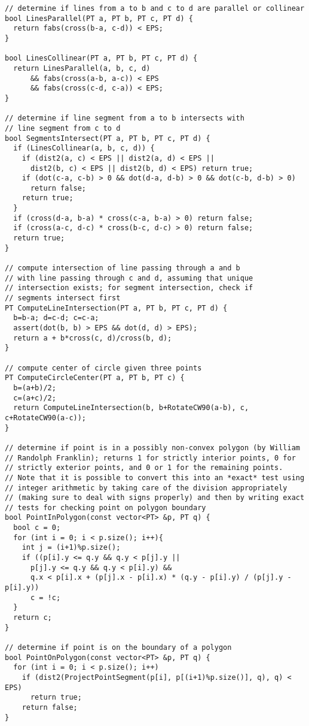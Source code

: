 \begin{lstlisting}
// determine if lines from a to b and c to d are parallel or collinear
bool LinesParallel(PT a, PT b, PT c, PT d) { 
  return fabs(cross(b-a, c-d)) < EPS; 
}

bool LinesCollinear(PT a, PT b, PT c, PT d) { 
  return LinesParallel(a, b, c, d)
      && fabs(cross(a-b, a-c)) < EPS
      && fabs(cross(c-d, c-a)) < EPS; 
}

// determine if line segment from a to b intersects with 
// line segment from c to d
bool SegmentsIntersect(PT a, PT b, PT c, PT d) {
  if (LinesCollinear(a, b, c, d)) {
    if (dist2(a, c) < EPS || dist2(a, d) < EPS ||
      dist2(b, c) < EPS || dist2(b, d) < EPS) return true;
    if (dot(c-a, c-b) > 0 && dot(d-a, d-b) > 0 && dot(c-b, d-b) > 0)
      return false;
    return true;
  }
  if (cross(d-a, b-a) * cross(c-a, b-a) > 0) return false;
  if (cross(a-c, d-c) * cross(b-c, d-c) > 0) return false;
  return true;
}

// compute intersection of line passing through a and b
// with line passing through c and d, assuming that unique
// intersection exists; for segment intersection, check if
// segments intersect first
PT ComputeLineIntersection(PT a, PT b, PT c, PT d) {
  b=b-a; d=c-d; c=c-a;
  assert(dot(b, b) > EPS && dot(d, d) > EPS);
  return a + b*cross(c, d)/cross(b, d);
}

// compute center of circle given three points
PT ComputeCircleCenter(PT a, PT b, PT c) {
  b=(a+b)/2;
  c=(a+c)/2;
  return ComputeLineIntersection(b, b+RotateCW90(a-b), c, c+RotateCW90(a-c));
}

// determine if point is in a possibly non-convex polygon (by William
// Randolph Franklin); returns 1 for strictly interior points, 0 for
// strictly exterior points, and 0 or 1 for the remaining points.
// Note that it is possible to convert this into an *exact* test using
// integer arithmetic by taking care of the division appropriately
// (making sure to deal with signs properly) and then by writing exact
// tests for checking point on polygon boundary
bool PointInPolygon(const vector<PT> &p, PT q) {
  bool c = 0;
  for (int i = 0; i < p.size(); i++){
    int j = (i+1)%p.size();
    if ((p[i].y <= q.y && q.y < p[j].y || 
      p[j].y <= q.y && q.y < p[i].y) &&
      q.x < p[i].x + (p[j].x - p[i].x) * (q.y - p[i].y) / (p[j].y - p[i].y))
      c = !c;
  }
  return c;
}

// determine if point is on the boundary of a polygon
bool PointOnPolygon(const vector<PT> &p, PT q) {
  for (int i = 0; i < p.size(); i++)
    if (dist2(ProjectPointSegment(p[i], p[(i+1)%p.size()], q), q) < EPS)
      return true;
    return false;
}


\end{lstlisting}
